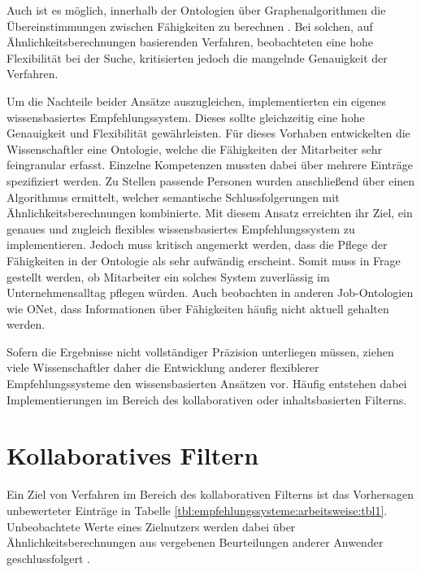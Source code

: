 Auch ist es möglich, innerhalb der Ontologien über Graphenalgorithmen die Übereinstimmungen zwischen Fähigkeiten zu berechnen \cite[S. 1f.]{balachander:2018}. Bei solchen, auf Ähnlichkeitsberechnungen basierenden Verfahren, beobachteten \textcite[S. 4]{bianchini:2008} eine hohe Flexibilität bei der Suche, kritisierten jedoch die mangelnde Genauigkeit der Verfahren.

Um die Nachteile beider Ansätze auszugleichen, implementierten \textcite[S. 4ff.]{semanticMatchmaking:2009} ein eigenes wissensbasiertes Empfehlungssystem. Dieses sollte gleichzeitig eine hohe Genauigkeit und Flexibilität gewährleisten. Für dieses Vorhaben entwickelten die Wissenschaftler eine Ontologie, welche die Fähigkeiten der Mitarbeiter sehr feingranular erfasst. Einzelne Kompetenzen mussten dabei über mehrere Einträge spezifiziert werden. Zu Stellen passende Personen wurden anschließend über einen Algorithmus ermittelt, welcher semantische Schlussfolgerungen mit Ähnlichkeitsberechnungen kombinierte. Mit diesem Ansatz erreichten \textcite[S. 11f.]{semanticMatchmaking:2009} ihr Ziel, ein genaues und zugleich flexibles wissensbasiertes Empfehlungssystem zu implementieren. Jedoch muss kritisch angemerkt werden, dass die Pflege der Fähigkeiten in der Ontologie als sehr aufwändig erscheint. Somit muss in Frage gestellt werden, ob Mitarbeiter ein solches System zuverlässig im Unternehmensalltag pflegen würden. Auch \textcite[S. 2]{aCombinedRepresentation:2018} beobachten in anderen Job-Ontologien wie \acs{ONet}, dass Informationen über Fähigkeiten häufig nicht aktuell gehalten werden.

Sofern die Ergebnisse nicht vollständiger Präzision unterliegen müssen, ziehen viele Wissenschaftler daher die Entwicklung anderer flexiblerer Empfehlungssysteme den wissensbasierten Ansätzen vor. Häufig entstehen dabei Implementierungen im Bereich des kollaborativen oder inhaltsbasierten Filterns. %

\section{Kollaboratives Filtern}
\label{ch:empfehlungssysteme:cf}
Ein Ziel von Verfahren im Bereich des kollaborativen Filterns ist das Vorhersagen unbewerteter Einträge in Tabelle \ref{tbl:empfehlungssysteme:arbeitsweise:tbl1}. Unbeobachtete Werte eines Zielnutzers werden dabei über Ähnlichkeitsberechnungen aus vergebenen Beurteilungen anderer Anwender geschlussfolgert \cite[S. 1]{su:2009}.


